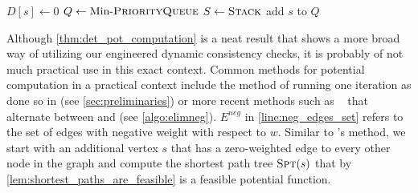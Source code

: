 \begin{algorithm}[!htb]
  \caption{
    \algen~\cite{NegSSSPNearLinear,NegSSSPNowFaster}
  }
  \label{algo:elimneg}


  \BlankLine
  $D[s] \gets 0$\;
  \BlankLine
  $Q \gets \text{Min-}\textsc{PriorityQueue}$\;
  $S \gets \textsc{Stack}$\;
  add $s$ to $Q$\;
\end{algorithm}

\bigskip

Although \cref{thm:det_pot_computation} is a neat result that shows a more broad way of utilizing our engineered dynamic consistency checks, it is probably of not much practical use in this exact context.
Common methods for potential computation in a practical context include the method of running one \algbf iteration as done so in \algjs (see \cref{sec:preliminaries}) or more recent methods such as \algen~\cite{NegSSSPNearLinear,NegSSSPNowFaster} that alternate between \algbf and \algdk (see \cref{algo:elimneg}).
$E^{neg}$ in \cref{line:neg_edges_set} refers to the set of edges with negative weight with respect to $w$.
Similar to \algjs's method, we start with an additional vertex $s$ that has a zero-weighted edge to every other node in the graph and compute the shortest path tree $\textsc{Spt}(s)$ that by \cref{lem:shortest_paths_are_feasible} is a feasible potential function.

